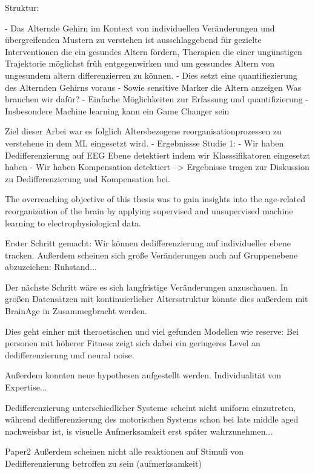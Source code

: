 Struktur: 

- Das Alternde Gehirn im Kontext von individuellen Veränderungen und übergreifenden Mustern zu verstehen ist ausschlaggebend für gezielte Interventionen die ein gesundes Altern fördern, Therapien die einer ungünstigen Trajektorie möglichst früh entgegenwirken und um gessundes Altern von ungesundem altern differenzierren zu können. 
- Dies setzt eine quantifiezierung des Alternden Gehirns voraus 
- Sowie sensitive Marker die Altern anzeigen
Was brauchen wir dafür? 
- Einfache Möglichkeiten zur Erfassung und quantifizierung 
- Insbesondere Machine learning kann ein Game Changer sein 

Ziel dieser Arbei war es folglich Altersbezogene reorganisationprozessen zu verstehene in dem ML eingesetzt wird.  
- Ergebnissse Studie 1:
    - Wir haben Dedifferenzierung auf EEG Ebene detektiert indem wir Klasssifikatoren eingesetzt haben 
    - Wir haben Kompensation detektiert 
    --> Ergebnisse tragen zur Diskussion zu Dedifferenzierung und Kompensation bei. 







The overreaching objective of this thesis was to gain insights into the age-related reorganization of the brain by applying supervised and unsupervised machine learning to electrophysiological data. 

Erster Schritt gemacht: Wir können dedifferenzierung auf individueller ebene tracken. Außerdem scheinen sich große Veränderungen auch auf Gruppenebene abzuzeichen: Ruhstand... 

Der nächste Schritt wäre es sich langfristige Veränderungen anzuschauen. In großen Datensätzen mit kontinuierlicher Altersstruktur könnte dies außerdem mit BrainAge in Zusammegbracht werden.  


Dies geht einher mit theroetischen und viel gefunden Modellen wie reserve: Bei personen mit höherer Fitness zeigt sich dabei ein geringeres Level an dedifferenzierung und neural noise. 

Außerdem konnten neue hypothesen aufgestellt werden. Individualität von Expertise...

Dedifferenzierung unterschiedlicher Systeme scheint nicht uniform einzutreten, während dedifferenzierung des motorischen Systems schon bei late middle aged nachweisbar ist, is visuelle Aufmerksamkeit erst später wahrzunehmen... 

Paper2 
Außerdem scheinen nicht alle reaktionen auf Stimuli von Dedifferenzierung betroffen zu sein (aufmerksamkeit) 

